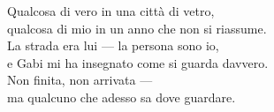 \begin{lyrics}
Qualcosa di vero in una città di vetro,\\
qualcosa di mio in un anno che non si riassume.\\
La strada era lui — la persona sono io,\\
e Gabi mi ha insegnato come si guarda davvero.\\
Non finita, non arrivata —\\
ma qualcuno che adesso sa dove guardare.

\end{lyrics}

